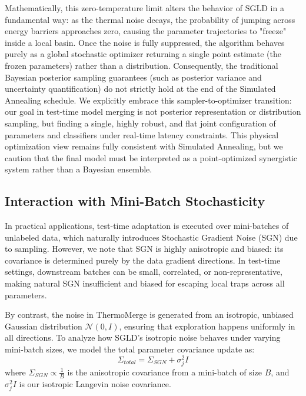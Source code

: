 Mathematically, this zero-temperature limit alters the behavior of SGLD in a fundamental way: as the thermal noise decays, the probability of jumping across energy barriers approaches zero, causing the parameter trajectories to "freeze" inside a local basin.
Once the noise is fully suppressed, the algorithm behaves purely as a global stochastic optimizer returning a single point estimate (the frozen parameters) rather than a distribution.
Consequently, the traditional Bayesian posterior sampling guarantees (such as posterior variance and uncertainty quantification) do not strictly hold at the end of the Simulated Annealing schedule.
We explicitly embrace this sampler-to-optimizer transition: our goal in test-time model merging is not posterior representation or distribution sampling, but finding a single, highly robust, and flat joint configuration of parameters and classifiers under real-time latency constraints.
This physical optimization view remains fully consistent with Simulated Annealing, but we caution that the final model must be interpreted as a point-optimized synergistic system rather than a Bayesian ensemble.

\subsection{Interaction with Mini-Batch Stochasticity}
In practical applications, test-time adaptation is executed over mini-batches of unlabeled data, which naturally introduces Stochastic Gradient Noise (SGN) due to sampling.
However, we note that SGN is highly anisotropic and biased: its covariance is determined purely by the data gradient directions.
In test-time settings, downstream batches can be small, correlated, or non-representative, making natural SGN insufficient and biased for escaping local traps across all parameters.

By contrast, the noise in ThermoMerge is generated from an isotropic, unbiased Gaussian distribution $\mathcal{N}(0, I)$, ensuring that exploration happens uniformly in all directions.
To analyze how SGLD's isotropic noise behaves under varying mini-batch sizes, we model the total parameter covariance update as:
\begin{equation}
    \Sigma_{total} = \Sigma_{SGN} + \sigma_j^2 I
\end{equation}
where $\Sigma_{SGN} \propto \frac{1}{B}$ is the anisotropic covariance from a mini-batch of size $B$, and $\sigma_j^2 I$ is our isotropic Langevin noise covariance.

